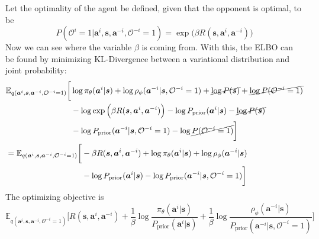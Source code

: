 Let the optimality of the agent be defined, given that the opponent is optimal, to be  
\begin{equation}
    P(\mathcal{O}^i = 1 | \boldsymbol{a}^i, \boldsymbol{s}, \boldsymbol{a}^{-i}, \mathcal{O}^{-i} = 1) = \exp\Big( \beta R(\boldsymbol{s}, \boldsymbol{a}^i, \boldsymbol{a}^{-i}) \Big)
\end{equation}
Now we can see where the variable $\beta$ is coming from. With this, the ELBO can be found by minimizing KL-Divergence between a variational distribution and joint probability:
\begin{equation*}
    \begin{aligned}
        &\begin{aligned}[t]
            \mathbb{E}_{q(\boldsymbol{a}^i, \boldsymbol{s}, \boldsymbol{a}^{-i}, \mathcal{O}^{-i} = 1)} \bigg[ &\log \pi_{\theta} (\boldsymbol{a}^i | \boldsymbol{s}) + \log \rho_{\phi}(\boldsymbol{a}^{-i} | \boldsymbol{s}, \mathcal{O}^{-i} = 1) + \cancel{\log P(\boldsymbol{s})} + \cancel{\log P(\mathcal{O}^{-i} = 1)}  \\
            &-\log \exp\Big( \beta R(\boldsymbol{s}, \boldsymbol{a}^i, \boldsymbol{a}^{-i}) \Big) - \log P_{\text{prior}}(\boldsymbol{a}^i | \boldsymbol{s}) - \cancel{\log  P(\boldsymbol{s})} \\
            &- \log P_{\text{prior}}(\boldsymbol{a}^{-i} | \boldsymbol{s}, \mathcal{O}^{-i} = 1) -\log \cancel{P(\mathcal{O}^{-i} = 1)} \bigg]
        \end{aligned} \\
        &= \begin{aligned}[t]
            \mathbb{E}_{q(\boldsymbol{a}^i, \boldsymbol{s}, \boldsymbol{a}^{-i}, \mathcal{O}^{-i} = 1)} \bigg[ &- \beta R(\boldsymbol{s}, \boldsymbol{a}^i, \boldsymbol{a}^{-i}) + \log \pi_{\theta} (\boldsymbol{a}^i | \boldsymbol{s}) + \log \rho_{\phi}(\boldsymbol{a}^{-i} | \boldsymbol{s}) \\
            &-\log P_{\text{prior}}(\boldsymbol{a}^i | \boldsymbol{s}) - \log P_{\text{prior}}(\boldsymbol{a}^{-i} | \boldsymbol{s}, \mathcal{O}^{-i} = 1) \bigg]
        \end{aligned}
    \end{aligned}
\end{equation*}
The optimizing objective is 
\begin{equation}
    \mathbb{E}_{q(\boldsymbol{a}^i, \boldsymbol{s}, \boldsymbol{a}^{-i}, \mathcal{O}^{-i} = 1)} \bigg[ R(\boldsymbol{s}, \boldsymbol{a}^i, \boldsymbol{a}^{-i}) + \frac{1}{\beta} \log \frac{\pi_{\theta} (\boldsymbol{a}^i | \boldsymbol{s})}{P_{\text{prior}}(\boldsymbol{a}^i | \boldsymbol{s})}  + \frac{1}{\beta} \log \frac{\rho_{\phi}(\boldsymbol{a}^{-i} | \boldsymbol{s})}{P_{\text{prior}}(\boldsymbol{a}^{-i} | \boldsymbol{s}, \mathcal{O}^{-i} = 1)} \bigg]
\end{equation}
